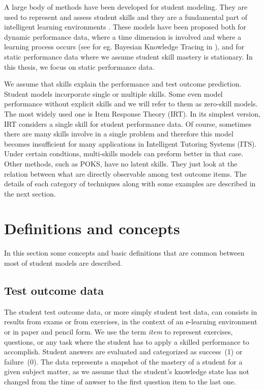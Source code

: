 \label{sec:RevLitt}

A large body of methods have been developed for student modeling.  They are used to represent and assess student skills and they are a fundamental part of intelligent learning environments \citep{Desmarais2011}. These models have been proposed both for dynamic performance data, where a time dimension is involved and where a learning process occurs (see for eg. Bayesian Knowledge Tracing in \citet{Koedinger2011}), and for static performance data where we assume student skill mastery is stationary.  In this thesis, we focus on static performance data.

We assume that skills explain the performance and test outcome prediction. Student models incorporate single or multiple skills.  Some even model performance without explicit skills and we will refer to them as zero-skill models. The most widely used one is Item Response Theory (IRT).  In its simplest version, IRT considers a single skill for student performance data. Of course, sometimes there are many skills involve in a single problem and therefore this model becomes insufficient for many applications in Intelligent Tutoring Systems (ITS). Under certain condtions, multi-skills models can preform better in that case. Other methods, such as POKS, have no latent skills. They just look at the relation between what are directly observable among test outcome items. The details of each category of techniques along with some examples are described in the next section.

\section{Definitions and concepts}

In this section some concepts and basic definitions that are common between most of student models are described. 
 
\subsection{Test outcome data}

The student test outcome data, or more simply student test data, can consists in results from exams or from exercises, in the context of an e-learning environment or in paper and pencil form.  We use the term \textit{item} to represent exercises, questions, or any task where the student has to apply a skilled performance to accomplish.  Student answers are evaluated and categorized as success~(1) or failure~(0).  The data represents a snapshot of the mastery of a student for a given subject matter, as we assume that the student's knowledge state has not changed from the time of anwser to the first question item to the last one.

